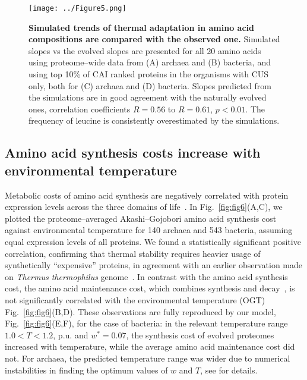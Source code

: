 \documentclass[10pt,letterpaper]{article}
\begin{document}
\begin{figure}[h!]
\texttt{[image: ../Figure5.png]}
\caption{
{\bf Simulated trends of thermal adaptation in amino acid compositions are compared with the observed one.} Simulated slopes vs the evolved slopes are presented for all 20 amino acids using proteome--wide data from (A) archaea and (B) bacteria, and using top 10\% of CAI ranked proteins in the organisms with CUS only, both for (C) archaea and (D) bacteria. Slopes predicted from the simulations are in good agreement with the naturally evolved ones, correlation coefficients $R=0.56$ to $R=0.61$, $p<0.01$. The frequency of leucine is consistently overestimated by the simulations.
}
\label{fig:fig5}
\end{figure}


\subsection*{Amino acid synthesis costs increase with environmental temperature}

Metabolic costs of amino acid synthesis are negatively correlated with protein expression levels across the three domains of life~\cite{Akashi2002Metabolic,Swire2007Selection}. In Fig.~\ref{fig:fig6}(A,C), we plotted the proteome--averaged Akashi--Gojobori amino acid synthesis cost against environmental temperature for 140 archaea and 543 bacteria, assuming equal expression levels of all proteins. We found a statistically significant positive correlation, confirming that thermal stability requires heavier usage of synthetically ``expensive'' proteins, in agreement with an earlier observation made on {\it Thermus thermophilus} genome~\cite{Swire2007Selection}. In contrast with the amino acid synthesis cost, the amino acid maintenance cost, which combines synthesis and decay~\cite{Krick2014Amino}, is not significantly correlated with the environmental temperature (OGT) Fig.~\ref{fig:fig6}(B,D). These observations are fully reproduced by our model, Fig.~\ref{fig:fig6}(E,F), for the case of bacteria: in the relevant temperature range $1.0 < T < 1.2$, p.u. and $w^*=0.07$,  the synthesis cost of evolved proteomes increased with temperature, while the average amino acid maintenance cost did not. For archaea, the predicted temperature range was wider due to numerical instabilities in finding the optimum values of $w$ and $T$, see  for details.
\end{document}
